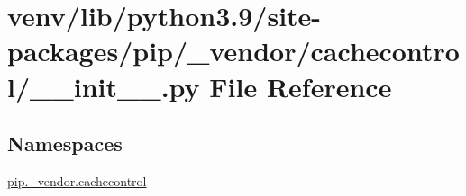\hypertarget{venv_2lib_2python3_89_2site-packages_2pip_2__vendor_2cachecontrol_2____init_____8py}{}\section{venv/lib/python3.9/site-\/packages/pip/\+\_\+vendor/cachecontrol/\+\_\+\+\_\+init\+\_\+\+\_\+.py File Reference}
\label{venv_2lib_2python3_89_2site-packages_2pip_2__vendor_2cachecontrol_2____init_____8py}
\subsection*{Namespaces}
\begin{DoxyCompactItemize}
\item 
 \hyperlink{namespacepip_1_1__vendor_1_1cachecontrol}{pip.\+\_\+vendor.\+cachecontrol}
\end{DoxyCompactItemize}
